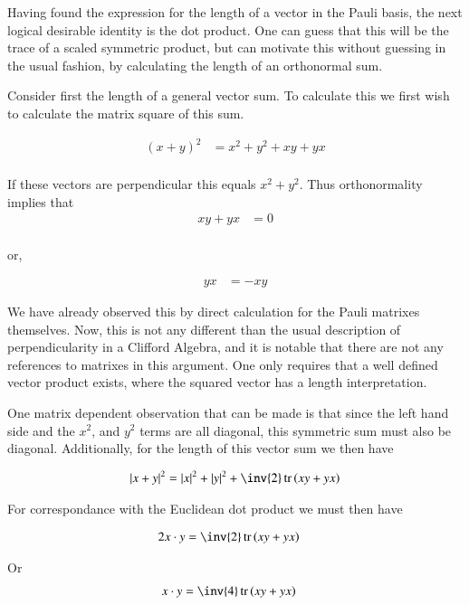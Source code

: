 \documentclass{article}
\DeclareMathOperator{\tr}{tr}
\newcommand{\trace}[1]{\tr\left({#1}\right)}
\begin{document}
Having found the expression for the length of a vector in the Pauli basis, the next logical desirable identity is the dot product.  One can guess that
this will be the trace of a scaled symmetric product, but can motivate this without guessing in the usual fashion, by calculating the length of an 
orthonormal sum.

Consider first the length of a general vector sum.  To calculate this we first wish to calculate the matrix square of this sum.

\begin{align*}
(x + y)^2 &= x^2 + y^2 + x y + y x \\
\end{align*}

If these vectors are perpendicular this equals $x^2 + y^2$.  Thus orthonormality implies that
\begin{align*}
x y + y x &= 0 \\
\end{align*}

or,

\begin{align}
y x &= - x y
\end{align}

We have already observed this by direct calculation for the Pauli matrixes themselves.  Now, this is not any different than the usual description of perpendicularity in a Clifford Algebra, and it is notable that there are not any references to matrixes in this argument.  One only requires that a well defined vector
product exists, where the squared vector has a length interpretation.

One matrix dependent observation that can be made is that since the left hand side and the $x^2$, and $y^2$ terms are all diagonal, this symmetric sum must also be diagonal.  Additionally, for the length of this vector sum we then have

\begin{align*}
{\Abs{x + y}}^2
&= \Abs{x}^2 + \Abs{y}^2 + \inv{2}\trace{x y + y x} \\
\end{align*}

For correspondance with the Euclidean dot product we must then have

\begin{align*}
2 x \cdot y &= \inv{2}\trace{x y + y x}
\end{align*}

Or
\begin{align}
x \cdot y &= \inv{4}\trace{x y + y x}
\end{align}
\end{document}
